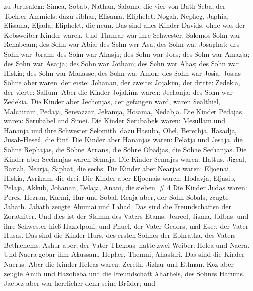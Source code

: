 zu Jerusalem: Simea, Sobab, Nathan, Salomo, die vier von Bath-Seba, der
Tochter Ammiels;  dazu Jibhar, Elisama, Eliphelet,
 Nogah, Nepheg, Japhia,  Elisama, Eljada,
Eliphelet, die neun.  Das sind alles Kinder Davids, ohne was
der Kebsweiber Kinder waren. Und Thamar war ihre Schwester.
 Salomos Sohn war Rehabeam; des Sohn war Abia; des Sohn war
Asa; des Sohn war Josaphat;  des Sohn war Joram; des Sohn
war Ahasja; des Sohn war Joas;  des Sohn war Amazja; des
Sohn war Asarja; des Sohn war Jotham;  des Sohn war Ahas;
des Sohn war Hiskia; des Sohn war Manasse;  des Sohn war
Amon; des Sohn war Josia.  Josias Söhne aber waren: der
erste: Johanan, der zweite: Jojakim, der dritte: Zedekia, der vierte:
Sallum.  Aber die Kinder Jojakims waren: Jechonja; des Sohn
war Zedekia.  Die Kinder aber Jechonjas, der gefangen ward,
waren Sealthiel,  Malchiram, Pedaja, Seneazzar, Jekamja,
Hosama, Nedabja.  Die Kinder Pedajas waren: Serubabel und
Simei. Die Kinder Serubabels waren: Mesullam und Hananja und ihre
Schwester Selomith;  dazu Hasuba, Ohel, Berechja, Hasadja,
Jusab-Hesed, die fünf.  Die Kinder aber Hananjas waren:
Pelatja und Jesaja, die Söhne Rephajas, die Söhne Arnans, die Söhne
Obadjas, die Söhne Sechanjas.  Die Kinder aber Sechanjas
waren Semaja. Die Kinder Semajas waren: Hattus, Jigeal, Bariah, Nearja,
Saphat, die sechs.  Die Kinder aber Nearjas waren:
Eljoenai, Hiskia, Asrikam, die drei.  Die Kinder aber
Eljoenais waren: Hodavja, Eljasib, Pelaja, Akkub, Johanan, Delaja,
Anani, die sieben. \# 4  Die Kinder Judas waren: Perez,
Hezron, Karmi, Hur und Sobal.  Reaja aber, der Sohn Sobals,
zeugte Jahath. Jahath zeugte Ahumai und Lahad. Das sind die
Freundschaften der Zorathiter.  Und dies ist der Stamm des
Vaters Etams: Jesreel, Jisma, Jidbas; und ihre Schwester hieß
Hazlelponi;  und Pnuel, der Vater Gedors, und Eser, der
Vater Husas. Das sind die Kinder Hurs, des ersten Sohnes der Ephratha,
des Vaters Bethlehems.  Ashur aber, der Vater Thekoas, hatte
zwei Weiber: Helea und Naera.  Und Naera gebar ihm Ahussam,
Hepher, Themni, Ahastari. Das sind die Kinder Naeras.  Aber
die Kinder Heleas waren: Zereth, Jizhar und Ethnan.  Koz
aber zeugte Anub und Hazobeba und die Freundschaft Aharhels, des Sohnes
Harums.  Jaebez aber war herrlicher denn seine Brüder; und
